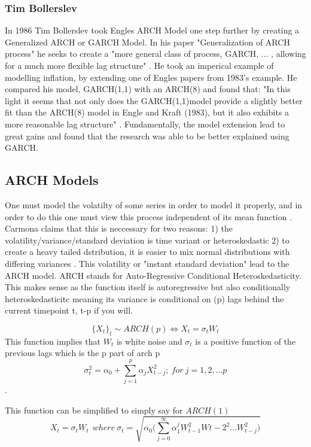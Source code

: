 \subsubsection{Tim Bollerslev}
In 1986 Tim Bollerslev took Engles ARCH Model one step further by creating a Generalized ARCH or GARCH Model. In his paper "Generalization of ARCH process" \cite{BOLLERSLEV1986307} he seeks to create a "more general class of process, GARCH, ... , allowing for a much more flexible lag structure" \cite{BOLLERSLEV1986307}. He took an imperical example of modelling inflation, by extending one of Engles papers from 1983's example. He compared his model, GARCH(1,1) with an ARCH(8) and found that: "In this light it seems that not only does the GARCH(1,1)model provide a slightly better fit than the ARCH(8) model in Engle and Kraft (1983), but it also exhibits a more reasonable lag structure" \cite{BOLLERSLEV1986307}. Fundamentally, the model extension lead to great gains and found that the research was able to be better explained using GARCH. 

\subsection{ARCH Models}
One must model the volatilty of some series in order to model it properly, and in order to do this one must view this process independent of its mean function \cite{carmona2004}. Carmona claims that this is neccessary for two reasons: 1) the volatility/variance/standard deviation is time variant or heteroskedastic 2) to create a heavy tailed dstribution, it is easier to mix normal distributions with differing variances \cite{carmona2004}. This volatility or "instant standard deviation" lead to the ARCH model. ARCH stands for Auto-Regressive Conditional Heteroskedasticity. This makes sense as the function itself is autoregressive but also conditionally heteroskedasticitc meaning its variance is conditional on (p) lags behind the current timepoint t, t-p if you will. 

$$\{X_t\}_t \sim ARCH(p) \iff X_t = \sigma_tW_t$$ This function implies that $W_t$ is white noise and $\sigma_t$ is a positive function of the previous lags which is the p part of arch p $$\sigma_t^2 = \alpha_0 + \sum^p_{j=1} \alpha_jX^2_{t-j}; ~ for~j = 1,2,...p$$ \cite{carmona2004}.

This function can be simplified to simply say for $ARCH(1)$
$$X_t = \sigma_tW_t ~ ~ where ~\sigma_t = \sqrt{\alpha_0\bigg(\sum^\infty_{j=0} \alpha_1^jW_{t-1}^2W{t-2}^2...W_{t-j}^2)}$$

